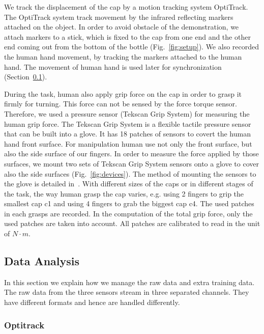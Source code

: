 We track the displacement of the cap by a motion tracking system OptiTrack. The OptiTrack system track movement by the infrared reflecting markers attached on the object. In order to avoid obstacle of the demonstration, we attach markers to a stick, which is fixed to the cap from one end and the other end coming out from the bottom of the bottle (Fig.~\ref{fig:setup}). We also recorded the human hand movement, by tracking the markers attached to the human hand. The movement of human hand is used later for synchronization (Section~\ref{cha4:sec3:dataanalysis}).

During the task, human also apply grip force on the cap in order to grasp it firmly for turning. This force can not be sensed by the force torque sensor. Therefore, we used a pressure sensor (Tekscan Grip System) for measuring the human grip force. The Tekscan Grip System is a flexible tactile pressure sensor that can be built into a glove. It has 18 patches of sensors to covert the human hand front surface. For manipulation human use not only the front surface, but also the side surface of our fingers. In order to measure the force applied by those surfaces, we mount two sets of Tekscan Grip System sensors onto a glove to cover also the side surfaces (Fig.~\ref{fig:devices}). The method of mounting the sensors to the glove is detailed in~\cite{deSouza2014}. With different sizes of the caps or in different stages of the task, the way human grasp the cap varies, e.g. using 2 fingers to grip the smallest cap c1 and using 4 fingers to grab the biggest cap c4. The used patches in each grasps are recorded. In the computation of the total grip force, only the used patches are taken into account. All patches are calibrated to read in the unit of $N{\cdot}m$.


\subsection{Data Analysis}
\label{cha4:sec3:dataanalysis}
In this section we explain how we manage the raw data and extra training data.
The raw data from the three sensors stream in three separated channels. They have different formats and hence are handled differently.


\subsubsection{Optitrack}

